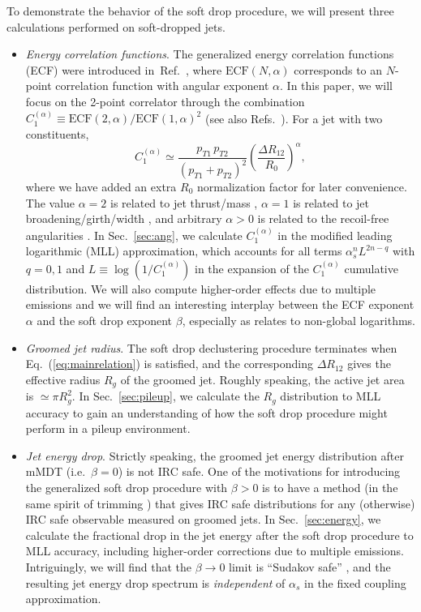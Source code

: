 \documentclass[letterpaper,11pt]{article}
\newcommand{\as}{\alpha_s}
\newcommand{\C}[2]{C^{(#2)}_{#1}}
\newcommand{\ECF}[2]{\text{ECF}\left(#1,#2\right)}
\newcommand{\ea}{{\C{1}{\alpha}}}
\DeclareRobustCommand{\Sec}[1]{Sec.~\ref{#1}}
\DeclareRobustCommand{\Eq}[1]{Eq.~(\ref{#1})}
\DeclareRobustCommand{\Ref}[1]{Ref.~\cite{#1}}
\DeclareRobustCommand{\Refs}[1]{Refs.~\cite{#1}}
\begin{document}
To demonstrate the behavior of the soft drop procedure, we will present three calculations performed on soft-dropped jets.
\begin{itemize}
\item \textit{Energy correlation functions}.  The generalized energy correlation functions (ECF) were introduced in~\Ref{Larkoski:2013eya}, where $\ECF{N}{\alpha}$ corresponds to an $N$-point correlation function with angular exponent $\alpha$.  In this paper, we will focus on the 2-point correlator through the combination $\C{1}{\alpha} \equiv  \ECF{2}{\alpha} /  \ECF{1}{\alpha}^2$ (see also \Refs{Banfi:2004yd,Jankowiak:2011qa}).  For a jet with two constituents,
\begin{equation}
\label{eq:C1simpdef}
\C{1}{\alpha} \simeq \frac{p_{T1} \, p_{T2}}{(p_{T1} + p_{T2})^2}  \left(\frac{\Delta R_{12}}{R_0} \right)^\alpha,
\end{equation}
where we have added an extra $R_0$ normalization factor for later convenience.  The value $\alpha = 2$ is related to jet thrust/mass \cite{Berger:2003iw,Almeida:2008yp,Ellis:2010rwa}, $\alpha = 1$ is related to jet broadening/girth/width \cite{Gallicchio:2010dq,Gallicchio:2011xq}, and arbitrary $\alpha > 0$ is related to the recoil-free angularities \cite{Larkoski:2014uqa}.  In \Sec{sec:ang}, we calculate $\C{1}{\alpha}$ in the modified leading logarithmic (MLL) approximation, which accounts for all terms $\as^n L^{2n-q}$ with $q=0,1$ and $L \equiv \log (1/\ea)$ in the expansion of the $\C{1}{\alpha}$ cumulative distribution.
%
We will also compute higher-order effects due to multiple emissions and we will find an interesting interplay between the ECF exponent $\alpha$ and the soft drop exponent $\beta$, especially as relates to non-global logarithms.
\item \textit{Groomed jet radius}.  The soft drop declustering procedure terminates when \Eq{eq:mainrelation} is satisfied, and the corresponding $\Delta R_{12}$ gives the effective radius $R_g$ of the groomed jet.  Roughly speaking, the active jet area \cite{jet-area} is $ \simeq \pi R_g^2$.  In \Sec{sec:pileup}, we calculate the $R_g$ distribution to MLL accuracy to gain an understanding of how the soft drop procedure might perform in a pileup environment.
\item \textit{Jet energy drop}.  Strictly speaking, the groomed jet energy distribution after mMDT (i.e.\ $\beta = 0$) is not IRC safe. One of the motivations for introducing the generalized soft drop procedure with $\beta > 0$ is to have a method (in the same spirit of trimming \cite{trimming}) that gives IRC safe distributions for any (otherwise) IRC safe observable measured on groomed jets.  In \Sec{sec:energy}, we calculate the fractional drop in the jet energy after the soft drop procedure to MLL accuracy, including higher-order corrections due to multiple emissions. Intriguingly, we will find that the $\beta \to 0$ limit is ``Sudakov safe'' \cite{Larkoski:2013paa}, and the resulting jet energy drop spectrum is \emph{independent} of  $\alpha_s$ in the fixed coupling approximation.
\end{itemize}
\end{document}
